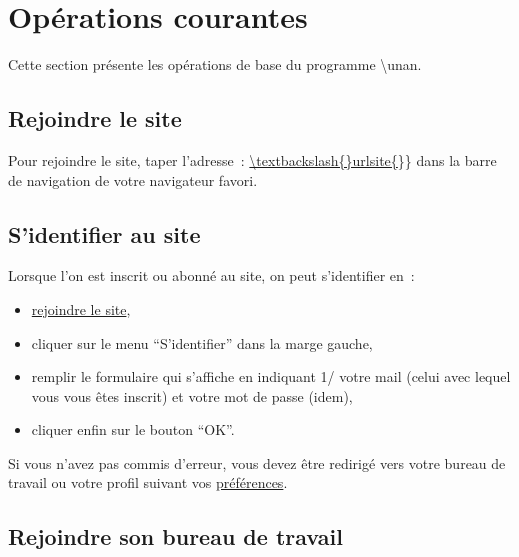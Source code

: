 % 
% 
% 
% 
% 
% 
% 
% 

\section{Opérations courantes}\hypertarget{operations-courantes}{}\label{operations-courantes}

Cette section présente les opérations de base du programme \textbackslash{}unan.

\subsection{Rejoindre le site}\hypertarget{rejoindre-le-site}{}\label{rejoindre-le-site}

Pour rejoindre le site, taper l'adresse~{}: \url{\textbackslash{}urlsite\{}\}\} dans la barre de navigation de votre navigateur favori.

\subsection{S'identifier au site}\hypertarget{vous-identifier}{}\label{vous-identifier}

Lorsque l'on est inscrit ou abonné au site, on peut s'identifier en~{}:

\begin{itemize}
\item \hyperlink{rejoindre-le-site}{rejoindre le site},
\item cliquer sur le menu ``S'identifier'' dans la marge gauche,
\item remplir le formulaire qui s'affiche en indiquant 1/ votre mail (celui avec lequel vous vous êtes inscrit) et votre mot de passe (idem),
\item cliquer enfin sur le bouton ``OK''.
\end{itemize}

Si vous n'avez pas commis d'erreur, vous devez être redirigé vers votre bureau de travail ou votre profil suivant vos \hyperlink{preferences-auteur}{préférences}.

\subsection{Rejoindre son bureau de travail}\hypertarget{rejoindre-bureau-travail}{}\label{rejoindre-bureau-travail}

